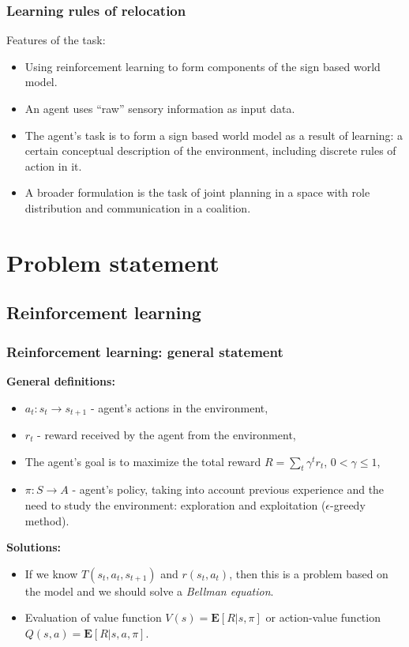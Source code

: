 \documentclass[default]{beamer}
\begin{document}
	\begin{frame}
		\frametitle{Learning rules of relocation}
		\footnotesize
		Features of the task:
		\begin{itemize}
			\item Using reinforcement learning to form components of the sign based world model.
			\item An agent uses ``raw'' sensory information as input data.
			\item The agent's task is to form a sign based world model as a result of learning: a certain conceptual description of the environment, including discrete rules of action in it.
			\item A broader formulation is the task of joint planning in a space with role distribution and communication in a coalition.
		\end{itemize}
		\begin{center}
		\end{center}
	\end{frame}


	\section{Problem statement}
	\subsection{Reinforcement learning}
	\begin{frame}
		\frametitle{Reinforcement learning: general statement}
		\textbf{General definitions:}
		\begin{itemize}
			\item $a_t: s_t\rightarrow s_{t+1}$ - agent's actions in the environment,
			\item $r_t$ - reward received by the agent from the environment,
			\item The agent's goal is to maximize the total reward $R=\sum\limits_{t}{{{\gamma }^{t}}}{{r}_{t}}$, $0<\gamma\le 1 $,
			\item $\pi :S\rightarrow A$ - agent's policy, taking into account previous experience and the need to study the environment: exploration and exploitation ($\epsilon$-greedy method).
		\end{itemize}
	
		\textbf{Solutions:}
		\begin{itemize}
			\item If we know $T(s_t,a_t,s_{t+1})$ and $r(s_t,a_t)$, then this is a problem based on the model and we should solve a \textit{Bellman equation}.
			\item Evaluation of value function $V(s)=\mathbf{E}[R|s,\pi]$ or action-value function $Q(s,a)=\mathbf{E}[R|s,a,\pi]$.
		\end{itemize}
	\vspace{-5pt}
	\nocite{*}
	\printbibliography[keyword={rlearn}, resetnumbers=true]
	\end{frame}
	
\end{document}
